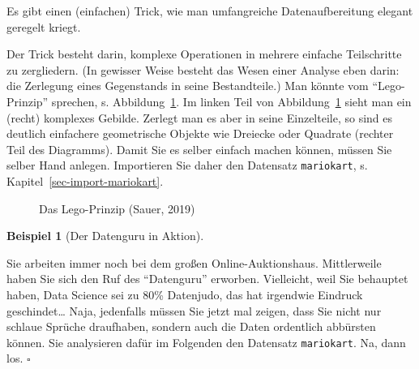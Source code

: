 \documentclass[
  letterpaper,
  twoside,
  open=any]{scrbook}
\theoremstyle{definition}
\theoremstyle{definition}
\newtheorem{example}{Beispiel}[chapter]
\theoremstyle{definition}
\theoremstyle{remark}
\begin{document}
Es gibt einen (einfachen) Trick, wie man umfangreiche Datenaufbereitung
elegant geregelt kriegt.

Der Trick besteht darin, komplexe Operationen in mehrere einfache
Teilschritte zu zergliedern. (In gewisser Weise besteht das Wesen einer
Analyse eben darin: die Zerlegung eines Gegenstands in seine
Bestandteile.) Man könnte vom \enquote{Lego-Prinzip} sprechen, s.
Abbildung~\ref{fig-lego}. Im linken Teil von Abbildung~\ref{fig-lego}
sieht man ein (recht) komplexes Gebilde. Zerlegt man es aber in seine
Einzelteile, so sind es deutlich einfachere geometrische Objekte wie
Dreiecke oder Quadrate (rechter Teil des Diagramms). Damit Sie es selber
einfach machen können, müssen Sie selber Hand anlegen. Importieren Sie
daher den Datensatz \texttt{mariokart}, s.
Kapitel~\ref{sec-import-mariokart}.

\begin{figure}


\caption{\label{fig-lego}Das Lego-Prinzip (Sauer, 2019)}

\end{figure}%

\begin{example}[Der Datenguru in
Aktion]\protect\hypertarget{exm-datenjudo}{}\label{exm-datenjudo}

Sie arbeiten immer noch bei dem großen Online-Auktionshaus. Mittlerweile
haben Sie sich den Ruf des \enquote{Datenguru} erworben. Vielleicht,
weil Sie behauptet haben, Data Science sei zu 80\% Datenjudo, das hat
irgendwie Eindruck geschindet\ldots{} Naja, jedenfalls müssen Sie jetzt
mal zeigen, dass Sie nicht nur schlaue Sprüche draufhaben, sondern auch
die Daten ordentlich abbürsten können. Sie analysieren dafür im
Folgenden den Datensatz \texttt{mariokart}. Na, dann los. \(\square\)

\end{example}
\end{document}
